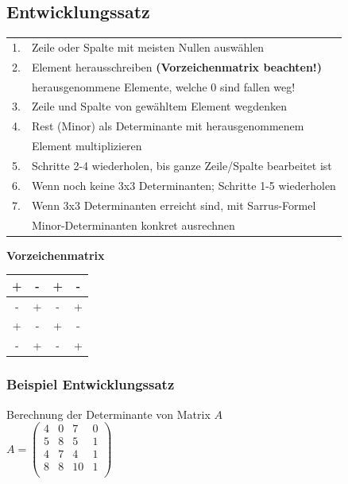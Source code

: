 		    
		    \subsection{Entwicklungssatz}
			
		    \begin{tabular}{ll}
			1. & Zeile oder Spalte mit meisten Nullen auswählen \\
			2. & Element herausschreiben \textbf{(Vorzeichenmatrix beachten!)} \\
			& herausgenommene Elemente, welche 0 sind fallen weg! \\
			3. & Zeile und Spalte von gewähltem Element wegdenken\\
			4. & Rest (Minor) als Determinante mit herausgenommenem \\
			& Element multiplizieren \\
			5. & Schritte 2-4 wiederholen, bis ganze Zeile/Spalte bearbeitet ist \\
			6. & Wenn noch keine 3x3 Determinanten; Schritte 1-5 wiederholen \\
			7. & Wenn 3x3 Determinanten erreicht sind, mit Sarrus-Formel \\
			& Minor-Determinanten konkret ausrechnen	\\	    		
		    \end{tabular}

			
		    \textbf{Vorzeichenmatrix} \\
		    
		    \begin{tabular}{| c | c | c | c |}
		    \hline
		    + & - & + & - \\
		    \hline
		    - & + & - & + \\
		    \hline
		    + & - & + & - \\
		    \hline
		    - & + & - & + \\
		    \hline
		    \end{tabular}
					    
		    \subsubsection{Beispiel Entwicklungssatz}
		    Berechnung der Determinante von Matrix $A$ \\
		    $A = \begin{pmatrix}
		    		4 & 0 & 7 & 0 \\
		    		5 & 8 & 5 & 1 \\
		    		4 & 7 & 4 & 1 \\
		    		8 & 8 & 10 & 1 \\
		    		\end{pmatrix}$ \\
		    		
